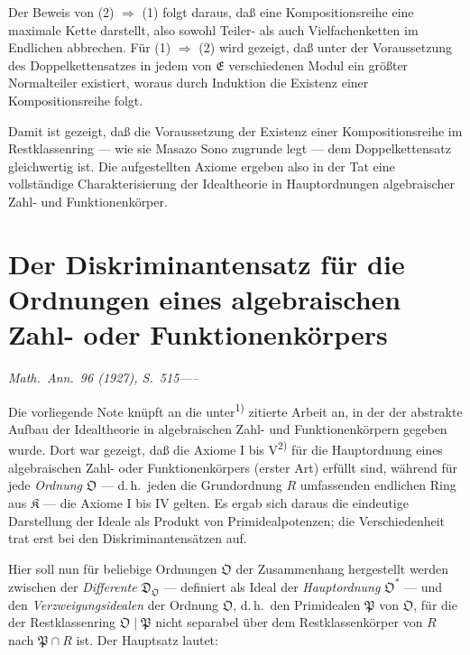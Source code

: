 \documentclass[12pt,a4paper]{article}
\newcommand{\fE}{\mathfrak{E}}
\newcommand{\fK}{\mathfrak{K}}
\newcommand{\fO}{\mathfrak{O}}
\newcommand{\fP}{\mathfrak{P}}
\theoremstyle{plain}
\theoremstyle{definition}
\theoremstyle{remark}
\begin{document}
Der Beweis von (2) $\Rightarrow$ (1) folgt daraus, daß eine Kompositionsreihe eine maximale Kette darstellt, also sowohl Teiler- als auch Vielfachenketten im Endlichen abbrechen. Für (1) $\Rightarrow$ (2) wird gezeigt, daß unter der Voraussetzung des Doppelkettensatzes in jedem von $\fE$ verschiedenen Modul ein größter Normalteiler existiert, woraus durch Induktion die Existenz einer Kompositionsreihe folgt.

Damit ist gezeigt, daß die Voraussetzung der Existenz einer Kompositionsreihe im Restklassenring --- wie sie Masazo Sono zugrunde legt --- dem Doppelkettensatz gleichwertig ist. Die aufgestellten Axiome ergeben also in der Tat eine vollständige Charakterisierung der Idealtheorie in Hauptordnungen algebraischer Zahl- und Funktionenkörper.

\newpage
\section*{Der Diskriminantensatz für die Ordnungen eines algebraischen Zahl- oder Funktionenkörpers}

\begin{center}
\textit{Math.\ Ann.\ 96 (1927), S.~515-----}
\end{center}

\vspace{0.5cm}

\noindent
Die vorliegende Note knüpft an die unter\textsuperscript{1)} zitierte Arbeit an, in der der abstrakte Aufbau der Idealtheorie in algebraischen Zahl- und Funktionenkörpern gegeben wurde. Dort war gezeigt, daß die Axiome I bis V\textsuperscript{2)} für die Hauptordnung eines algebraischen Zahl- oder Funktionenkörpers (erster Art) erfüllt sind, während für jede \textit{Ordnung} $\fO$ --- d.\,h.\ jeden die Grundordnung $R$ umfassenden endlichen Ring aus $\fK$ --- die Axiome I bis IV gelten. Es ergab sich daraus die eindeutige Darstellung der Ideale als Produkt von Primidealpotenzen; die Verschiedenheit trat erst bei den Diskriminantensätzen auf.

Hier soll nun für beliebige Ordnungen $\fO$ der Zusammenhang hergestellt werden zwischen der \textit{Differente} $\mathfrak{D}_{\fO}$ --- definiert als Ideal der \textit{Hauptordnung} $\fO^{*}$ --- und den \textit{Verzweigungsidealen} der Ordnung $\fO$, d.\,h.\ den Primidealen $\fP$ von $\fO$, für die der Restklassenring $\fO \mid \fP$ nicht separabel über dem Restklassenkörper von $R$ nach $\fP \cap R$ ist. Der Hauptsatz lautet:
\end{document}

